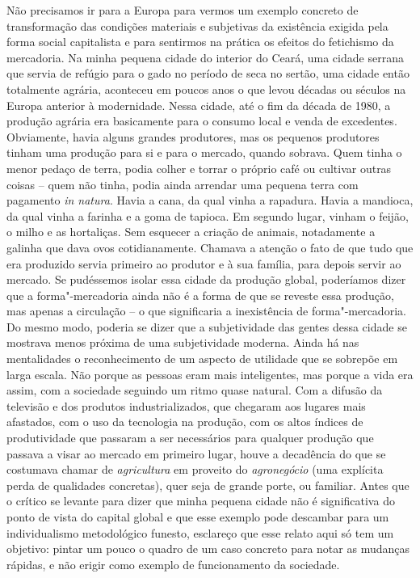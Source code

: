 Não precisamos ir para a Europa para vermos um exemplo concreto de
transformação das condições materiais e subjetivas da existência exigida
pela forma social capitalista e para sentirmos na prática os efeitos do
fetichismo da mercadoria. Na minha pequena cidade do interior do Ceará,
uma cidade serrana que servia de refúgio para o gado no período de seca
no sertão, uma cidade então totalmente agrária, aconteceu em poucos anos
o que levou décadas ou séculos na Europa anterior à modernidade. Nessa
cidade, até o fim da década de 1980, a produção agrária era basicamente
para o consumo local e venda de excedentes. Obviamente, havia alguns
grandes produtores, mas os pequenos produtores tinham uma produção para
si e para o mercado, quando sobrava. Quem tinha o menor pedaço de terra,
podia colher e torrar o próprio café ou cultivar outras coisas -- quem
não tinha, podia ainda arrendar uma pequena terra com pagamento \emph{in
natura}. Havia a cana, da qual vinha a rapadura. Havia a mandioca, da
qual vinha a farinha e a goma de tapioca. Em segundo lugar, vinham o
feijão, o milho e as hortaliças. Sem esquecer a criação de animais,
notadamente a galinha que dava ovos cotidianamente. Chamava a atenção o
fato de que tudo que era produzido servia primeiro ao produtor e à sua
família, para depois servir ao mercado. Se pudéssemos isolar essa cidade
da produção global, poderíamos dizer que a forma"-mercadoria ainda não é
a forma de que se reveste essa produção, mas apenas a circulação -- o
que significaria a inexistência de forma"-mercadoria. Do mesmo modo,
poderia se dizer que a subjetividade das gentes dessa cidade se mostrava
menos próxima de uma subjetividade moderna. Ainda há nas mentalidades o
reconhecimento de um aspecto de utilidade que se sobrepõe em larga
escala. Não porque as pessoas eram mais inteligentes, mas porque a vida
era assim, com a sociedade seguindo um ritmo quase natural. Com a
difusão da televisão e dos produtos industrializados, que chegaram aos
lugares mais afastados, com o uso da tecnologia na produção, com os
altos índices de produtividade que passaram a ser necessários para
qualquer produção que passava a visar ao mercado em primeiro lugar,
houve a decadência do que se costumava chamar de \emph{agricultura} em
proveito do \emph{agronegócio} (uma explícita perda de qualidades
concretas), quer seja de grande porte, ou familiar. Antes que o crítico
se levante para dizer que minha pequena cidade não é significativa do
ponto de vista do capital global e que esse exemplo pode descambar para
um individualismo metodológico funesto, esclareço que esse relato aqui
só tem um objetivo: pintar um pouco o quadro de um caso concreto para
notar as mudanças rápidas, e não erigir como exemplo de funcionamento da
sociedade.

